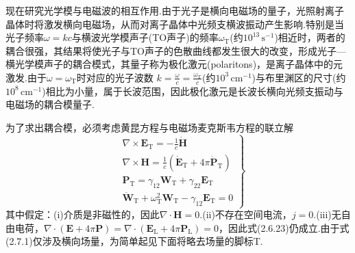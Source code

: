 现在研究光学模与电磁波的相互作用.由于光子是横向电磁场的量子，光照射离子晶体时将激发横向电磁场，从而对离子晶体中光频支横波振动产生影响.特别是当光子频率$\omega=kc$与横波光学模声子(TO声子)的频率$\omega_{\mathrm{T}}$(约$10^{13}\,\mathrm{s}^{-1}$)相近时，两者的耦合很强，其结果将使光子与TO声子的色散曲线都发生很大的改变，形成光子—横光学模声子的耦合模式，其量子称为极化激元(polaritons)，是离子晶体中的元激发.由于$\omega=\omega_{\mathrm{T}}$时对应的光子波数
$k=\frac{\omega}{c}=\frac{\omega_{\mathrm{T}}}{c}$(约$10^3\,\mathrm{cm}^{-1}$)与布里渊区的尺寸(约$10^8\,\mathrm{cm}^{-1}$)相比为小量，属于长波范围，因此极化激元是长波长横向光频支振动与电磁场的耦合模量子.

为了求出耦合模，必须考虑黄昆方程与电磁场麦克斯韦方程的联立解
\begin{equation}
\left.\begin{aligned}
  &\nabla\times\boldsymbol{E}_{\mathrm{T}}=-\frac{1}{c}\dot{\boldsymbol{H}}\\
  &\nabla\times\boldsymbol{H}=\frac{1}{c}
  (\dot{\boldsymbol{E}}_{\mathrm{T}}+4\pi\dot{\boldsymbol{P}}_{\mathrm{T}})\\
  &\boldsymbol{P}_{\mathrm{T}}=\gamma_{12}\boldsymbol{W}_{\mathrm{T}}
  +\gamma_{22}\boldsymbol{E}_{\mathrm{T}}\\
  &\ddot{\boldsymbol{W}}_{\mathrm{T}}+\omega_{\mathrm{T}}^2\boldsymbol{W}_{\mathrm{T}}
  -\gamma_{12}\boldsymbol{E}_{\mathrm{T}}=0
\end{aligned}\right\}
\end{equation}
其中假定：(i)介质是非磁性的，因此$\nabla\cdot\boldsymbol{H}=0$.(ii)不存在空间电流，$j=0$.(iii)无自由电荷，$\nabla\cdot(\boldsymbol{E}+4\pi\boldsymbol{P})
=\nabla\cdot(\boldsymbol{E}_{\mathrm{L}}+4\pi\boldsymbol{P}_{\mathrm{L}})=0$，因此式(2.6.23)仍成立.由于式(2.7.1)仅涉及横向场量，为简单起见下面将略去场量的脚标T.

